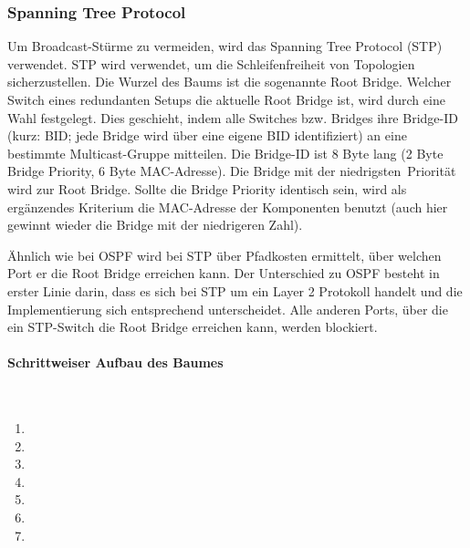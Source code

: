 \subsubsection{Spanning Tree Protocol}

Um Broadcast-Stürme zu vermeiden, wird das Spanning Tree Protocol (STP) verwendet. STP wird verwendet, um die Schleifenfreiheit von Topologien sicherzustellen. Die Wurzel des Baums ist die sogenannte Root Bridge. Welcher Switch eines redundanten Setups die aktuelle Root Bridge ist, wird durch eine Wahl festgelegt. Dies geschieht, indem alle Switches bzw. Bridges ihre Bridge-ID (kurz: BID; jede Bridge wird über eine eigene BID identifiziert) an eine bestimmte Multicast-Gruppe mitteilen. Die Bridge-ID ist 8 Byte lang (2 Byte Bridge Priority, 6 Byte MAC-Adresse). Die Bridge mit der \ql niedrigsten\qr\ Priorität wird zur Root Bridge. Sollte die Bridge Priority identisch sein, wird als ergänzendes Kriterium die MAC-Adresse der Komponenten benutzt (auch hier gewinnt wieder die Bridge mit der niedrigeren Zahl).

Ähnlich wie bei OSPF wird bei STP über Pfadkosten ermittelt, über welchen Port er die Root Bridge erreichen kann. Der Unterschied zu OSPF besteht in erster Linie darin, dass es sich bei STP um ein Layer 2 Protokoll handelt und die Implementierung sich entsprechend unterscheidet. Alle anderen Ports, über die ein STP-Switch die Root Bridge erreichen kann, werden blockiert.

\paragraph{Schrittweiser Aufbau des Baumes}~\\	

\begin{enumerate}
	\item 
	\item 
	\item 
	\item 
	\item 
	\item 
	\item 
\end{enumerate}
